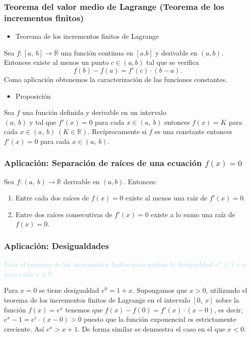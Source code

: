 \subsubsection{Teorema del valor medio de Lagrange (Teorema de los incrementos finitos)}
\begin{itemize}[label=\color{red}\textbullet, leftmargin=*]
	\item \color{lightblue}Teorema de los incrementos finitos de Lagrange
\end{itemize}
Sea $f:[a,~b]\rightarrow\mathbb{R}$ una función continua en $[a.b]$ y derivable en $(a,b)$. Entonces existe al menos un punto $c\in(a,b)$ tal que se verifica \[ f(b)-f(a)=f'(c)\cdot(b-a). \]
Como aplicación obtenemos la caracterización de las funciones constantes.
\begin{itemize}[label=\color{red}\textbullet, leftmargin=*]
	\item \color{lightblue}Proposición
\end{itemize}
Sea $f$ una función definida y derivable en un intervalo \\
$(a,~b)$ y tal que $f'(x)=0$ para cada $x\in(a,~b)$ entonces $f(x)=K$ para cada $x\in(a,~b)~(K\in\mathbb{R})$. Recíprocamente si $f$ es una constante entonces $f'(x)=0$ para cada $x\in(a,~b)$.
\subsubsection{Aplicación: Separación de raíces de una ecuación $f(x)=0$}
Sea $f:(a,~b)\rightarrow\mathbb{R}$ derivable en $(a,b)$. Entonces:
\begin{enumerate}[label=\arabic*)]
	\item Entre cada dos raíces de $f(x)=0$ existe al menos una raíz de $f'(x)=0$.
	\item Entre dos raíces consecutivas de $f'(x)=0$ existe  a lo sumo una raíz de $f(x)=0$.
\end{enumerate}
\subsubsection{Aplicación: Desigualdades}
\textcolor{lightblue}{Usar el teorema de los incrementos finitos para probar la desigualdad $e^x\le1+x$ para cada $x\in\mathbb{R}$.}

Para $x=0$ se tiene desigualdad $e^0=1+x$. Supongamos que $x>0$, utilizando el teorema de los incrementos finitos de Lagrange en el intervalo $[0,~x]$ sobre la función $f(x)=e^x$ tenemos que $f(x)-f(0)=f'(x)\cdot(x-0)$, es decir, $e^x-1=e^c\cdot(x-0)>0$ puesto que la función exponencial es estrictamente creciente. Así $e^x>x+1$. De forma similar se demuestra el caso en el que $x<0$.
